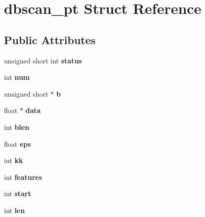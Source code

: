 \hypertarget{structdbscan__pt}{}\section{dbscan\+\_\+pt Struct Reference}
\label{structdbscan__pt}
\subsection*{Public Attributes}
\begin{DoxyCompactItemize}
\item 
\mbox{\label{structdbscan__pt_a5a42d9fe57034198ed5250f6f0ddb2cb}} 
unsigned short int {\bfseries status}
\item 
\mbox{\label{structdbscan__pt_aaa1b99005b0207af9c85a6fc73368eb3}} 
int {\bfseries num}
\item 
\mbox{\label{structdbscan__pt_aab10762fb46be396c06f36c7b8f84f64}} 
unsigned short $\ast$ {\bfseries b}
\item 
\mbox{\label{structdbscan__pt_a1da0197a70e570bd30de1872fe60cd6b}} 
float $\ast$ {\bfseries data}
\item 
\mbox{\label{structdbscan__pt_ac172b388c85db693e07e954f7d29e681}} 
int {\bfseries blen}
\item 
\mbox{\label{structdbscan__pt_ae73ddeeaca04d08756b022115639d607}} 
float {\bfseries eps}
\item 
\mbox{\label{structdbscan__pt_a07b73afdc253e16524b7eae0f6ec26b4}} 
int {\bfseries kk}
\item 
\mbox{\label{structdbscan__pt_a22b641c18fac3731d31e9ded8c0c93eb}} 
int {\bfseries features}
\item 
\mbox{\label{structdbscan__pt_ab35e524b61208589ee28bbf4a79341ae}} 
int {\bfseries start}
\item 
\mbox{\label{structdbscan__pt_a75fa5f27f7e41e5472087a847388daaf}} 
int {\bfseries len}
\item 

\end{DoxyCompactItemize}
